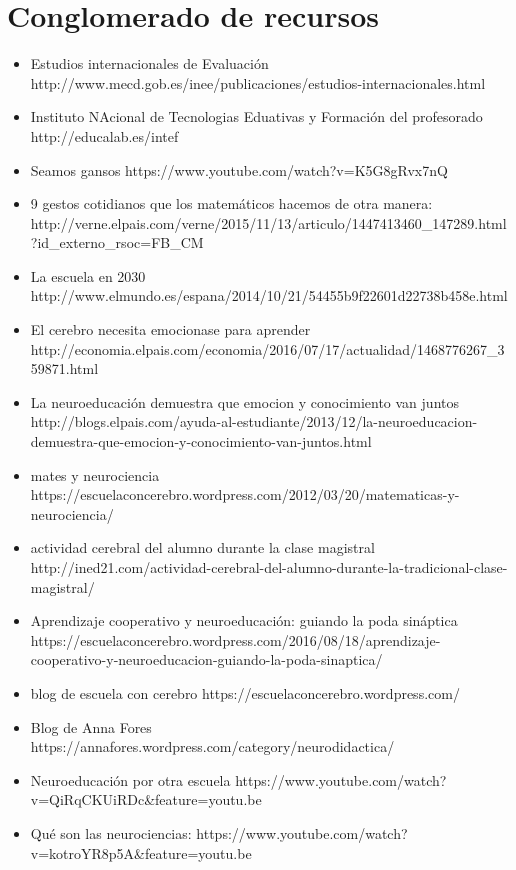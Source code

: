 
\section{Conglomerado de recursos}

\begin{itemize}
	\item
	Estudios internacionales de Evaluación
	http://www.mecd.gob.es/inee/publicaciones/estudios-internacionales.html 
	\item 
	Instituto NAcional de Tecnologias Eduativas y Formación del profesorado 
	http://educalab.es/intef
	\item 
	Seamos gansos
	https://www.youtube.com/watch?v=K5G8gRvx7nQ
	\item 
	9 gestos cotidianos que los matemáticos hacemos de otra manera:
	http://verne.elpais.com/verne/2015/11/13/articulo/1447413460_147289.html?id_externo_rsoc=FB_CM
	\item 
	La escuela en 2030
	http://www.elmundo.es/espana/2014/10/21/54455b9f22601d22738b458e.html
	\item 
	El cerebro necesita emocionase para aprender
	http://economia.elpais.com/economia/2016/07/17/actualidad/1468776267_359871.html
	\item 
	La neuroeducación demuestra que emocion y conocimiento van juntos
	http://blogs.elpais.com/ayuda-al-estudiante/2013/12/la-neuroeducacion-demuestra-que-emocion-y-conocimiento-van-juntos.html
	\item 
	mates y neurociencia
	https://escuelaconcerebro.wordpress.com/2012/03/20/matematicas-y-neurociencia/
	\item 
	actividad cerebral del alumno durante la clase magistral
	http://ined21.com/actividad-cerebral-del-alumno-durante-la-tradicional-clase-magistral/
	\item 
	Aprendizaje cooperativo y neuroeducación: guiando la poda sináptica
	https://escuelaconcerebro.wordpress.com/2016/08/18/aprendizaje-cooperativo-y-neuroeducacion-guiando-la-poda-sinaptica/
	\item 
	blog de escuela con cerebro
	https://escuelaconcerebro.wordpress.com/
	\item
	Blog de Anna Fores
	https://annafores.wordpress.com/category/neurodidactica/
	\item 
	Neuroeducación por otra escuela
	https://www.youtube.com/watch?v=QiRqCKUiRDc&feature=youtu.be
	\item 
	Qué son las neurociencias:
	https://www.youtube.com/watch?v=kotroYR8p5A&feature=youtu.be

\end{itemize}
